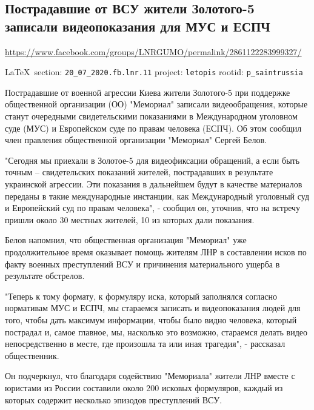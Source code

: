  
 

\subsection{Пострадавшие от ВСУ жители Золотого-5 записали видеопоказания для МУС и ЕСПЧ }
\url{https://www.facebook.com/groups/LNRGUMO/permalink/2861122283999327/}
  
\vspace{0.5cm}
{\small\LaTeX~section: \verb|20_07_2020.fb.lnr.11| project: \verb|letopis| rootid: \verb|p_saintrussia|}
\vspace{0.5cm}

Пострадавшие от военной агрессии Киева жители Золотого-5 при поддержке
общественной организации (ОО) "Мемориал" записали видеообращения, которые
станут очередными свидетельскими показаниями в Международном уголовном суде
(МУС) и Европейском суде по правам человека (ЕСПЧ). Об этом сообщил член
правления общественной организации "Мемориал" Сергей Белов. 

"Сегодня мы приехали в Золотое-5 для видеофиксации обращений, а если быть
точным – свидетельских показаний жителей, пострадавших в результате украинской
агрессии. Эти показания в дальнейшем будут в качестве материалов переданы в
такие международные инстанции, как Международный уголовный суд и Европейский
суд по правам человека", - сообщил он, уточнив, что на встречу пришли около 30
местных жителей, 10 из которых дали показания. 

Белов напомнил, что общественная организация "Мемориал" уже продолжительное
время оказывает помощь жителям ЛНР в составлении исков по факту военных
преступлений ВСУ и причинения материального ущерба в результате обстрелов. 

"Теперь к тому формату, к формуляру иска, который заполнялся согласно
нормативам МУС и ЕСПЧ, мы стараемся записать и видеопоказания людей для того,
чтобы дать максимум информации, чтобы было видно человека, который пострадал и,
самое главное, мы, насколько это возможно, стараемся делать видео
непосредственно в месте, где произошла та или иная трагедия", - рассказал
общественник. 

Он подчеркнул, что благодаря содействию "Мемориала" жители ЛНР вместе с
юристами из России составили около 200 исковых формуляров, каждый из которых
содержит несколько эпизодов преступлений ВСУ. 

